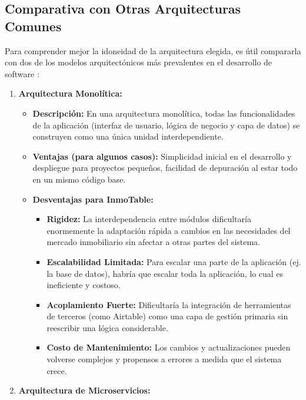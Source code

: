 \clearpage


\subsection{Comparativa con Otras Arquitecturas Comunes}


Para comprender mejor la idoneidad de la arquitectura elegida, es útil compararla con dos de los modelos arquitectónicos más prevalentes en el desarrollo de software \cite{scribd2024arquitectura}:

\begin{enumerate}

    \item \textbf{Arquitectura Monolítica:}

    \begin{itemize}
        \item \textbf{Descripción:} En una arquitectura monolítica, todas las funcionalidades de la aplicación (interfaz de usuario, lógica de negocio y capa de datos) se construyen como una única unidad interdependiente.
        \item \textbf{Ventajas (para algunos casos):} Simplicidad inicial en el desarrollo y despliegue para proyectos pequeños, facilidad de depuración al estar todo en un mismo código base.
        \item \textbf{Desventajas para InmoTable:}
        \begin{itemize}
            \item \textbf{Rigidez:} La interdependencia entre módulos dificultaría enormemente la adaptación rápida a cambios en las necesidades del mercado inmobiliario sin afectar a otras partes del sistema.
            \item \textbf{Escalabilidad Limitada:} Para escalar una parte de la aplicación (ej. la base de datos), habría que escalar toda la aplicación, lo cual es ineficiente y costoso.
            \item \textbf{Acoplamiento Fuerte:} Dificultaría la integración de herramientas de terceros (como Airtable) como una capa de gestión primaria sin reescribir una lógica considerable.
            \item \textbf{Costo de Mantenimiento:} Los cambios y actualizaciones pueden volverse complejos y propensos a errores a medida que el sistema crece.
        \end{itemize}
    \end{itemize}

    \item \textbf{Arquitectura de Microservicios:}


\end{enumerate}
